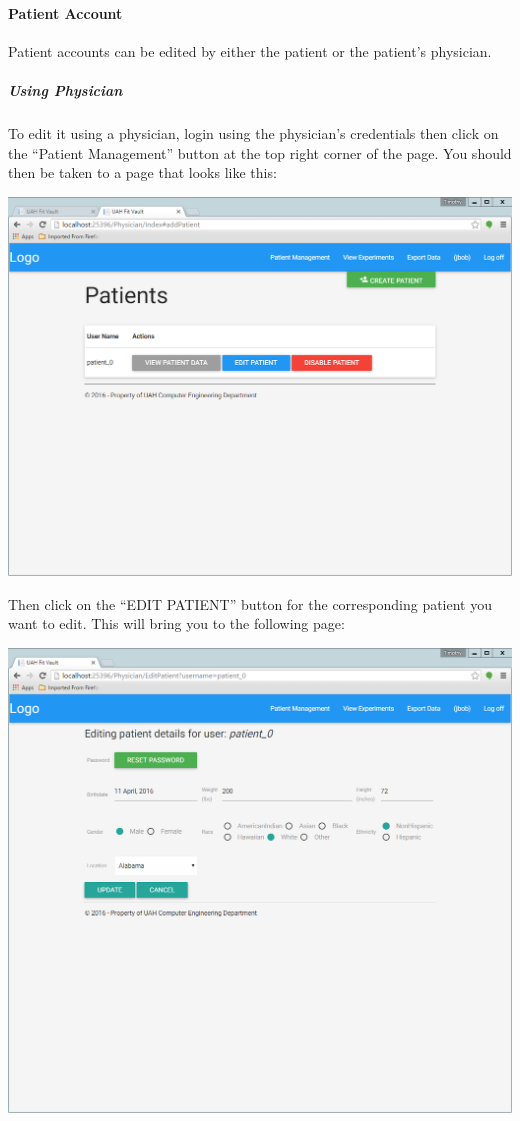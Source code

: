 \documentclass[letterpaper,10pt,english]{sphinxmanual}
\begin{document}
\paragraph{Patient Account}
\label{user_guide/account_edit:patient-account}
Patient accounts can be edited by either the patient or the patient's physician.


\subparagraph{Using Physician}
\label{user_guide/account_edit:using-physician}
To edit it using a physician, login using the physician's credentials then click on the ``Patient Management'' button
at the top right corner of the page. You should then be taken to a page that looks like this:

\includegraphics{patient_management.png}

Then click on the ``EDIT PATIENT'' button for the corresponding patient you want to edit. This will bring you to the
following page:

\includegraphics{edit_patient_account_physician.png}
\end{document}
